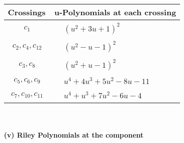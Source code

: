 \documentclass[1p]{elsarticle_modified}
\theoremstyle{definition}
\begin{document}
\begin{tabular}{m{50pt}|m{274pt}}
Crossings & \hspace{64pt}u-Polynomials at each crossing \\
\hline $$\begin{aligned}c_{1}\end{aligned}$$&$\begin{aligned}
&(u^2+3 u+1)^2
\end{aligned}$\\
\hline $$\begin{aligned}c_{2},c_{4},c_{12}\end{aligned}$$&$\begin{aligned}
&(u^2- u-1)^2
\end{aligned}$\\
\hline $$\begin{aligned}c_{3},c_{8}\end{aligned}$$&$\begin{aligned}
&(u^2+u-1)^2
\end{aligned}$\\
\hline $$\begin{aligned}c_{5},c_{6},c_{9}\end{aligned}$$&$\begin{aligned}
&u^4+4 u^3+5 u^2-8 u-11
\end{aligned}$\\
\hline $$\begin{aligned}c_{7},c_{10},c_{11}\end{aligned}$$&$\begin{aligned}
&u^4+u^3+7 u^2-6 u-4
\end{aligned}$\\
\hline
\end{tabular}\\~\\
\newpage\renewcommand{\arraystretch}{1}
\flushleft \textbf{(v) Riley Polynomials at the component}\newline \\
\end{document}
